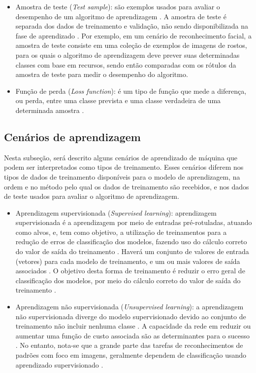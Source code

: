 \documentclass[
	12pt,				%
	oneside,			%
	a4paper,			%
	english,			%
	brazil				%
	]{abntex2ppgsi}
\begin{document}
\begin{itemize}
  \item Amostra de teste (\textit{Test sample}): são exemplos usados para avaliar o desempenho de um algoritmo de aprendizagem \cite{mohri2018foundations}. A amostra de teste é separada dos dados de treinamento e validação, não sendo disponibilizada na fase de aprendizado \cite{mohri2018foundations}. Por exemplo, em um cenário de reconhecimento facial, a amostra de teste consiste em uma coleção de exemplos de imagens de rostos, para os quais o algoritmo de aprendizagem deve prever suas determinadas classes com base em recursos, sendo então comparadas com os rótulos da amostra de teste para medir o desempenho do algoritmo.

  \item Função de perda (\textit{Loss function}): é um tipo de função que mede a diferença, ou perda, entre uma classe prevista e uma classe verdadeira de uma determinada amostra \cite{mohri2018foundations}.
\end{itemize}

\subsection{Cenários de aprendizagem}
Nesta subseção, será descrito alguns cenários de aprendizado de máquina que podem ser interpretados como tipos de treinamento. Esses cenários diferem nos tipos de dados de treinamento disponíveis para o modelo de aprendizagem, na ordem e no método pelo qual os dados de treinamento são recebidos, e nos dados de teste usados para avaliar o algoritmo de aprendizagem.

\begin{itemize}
  \item Aprendizagem supervisionada (\textit{Supervised learning}): aprendizagem supervisionada é a aprendizagem por meio de entradas pré-rotuladas, atuando como alvos, e, tem como objetivo, a utilização de treinamentos para a redução de erros de classificação dos modelos, fazendo uso do cálculo correto do valor de saída do treinamento \cite{o2015introduction}. Haverá um conjunto de valores de entrada (vetores) para cada modelo de treinamento, e um ou mais valores de saída associados \cite{o2015introduction}. O objetivo desta forma de treinamento é reduzir o erro geral de classificação dos modelos, por meio do cálculo correto do valor de saída do treinamento \cite{o2015introduction}.
  
  \item Aprendizagem não supervisionada (\textit{Unsupervised learning}): a aprendizagem não supervisionada diverge do modelo supervisionado devido ao conjunto de treinamento não incluir nenhuma classe \cite{o2015introduction}. A capacidade da rede em reduzir ou aumentar uma função de custo associada são as determinantes para o sucesso \cite{o2015introduction}. No entanto, nota-se que a grande parte das tarefas de reconhecimentos de padrões com foco em imagens, geralmente dependem de classificação usando aprendizado supervisionado \cite{o2015introduction}.
\end{itemize}
\end{document}
